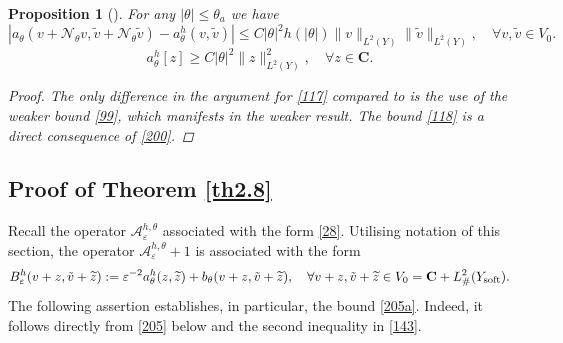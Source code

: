 \documentclass[11pt]{article}
\newcommand\e {\varepsilon}
\newcommand\soft{{\rm soft}}
\def\C{\mathbf {C}}
\def\AA{\mathcal{A}}
\newtheorem{proposition}[theorem]{Proposition}
\theoremstyle{remark}
\begin{document}
\begin{proposition}[{\cite[Proposition 5.5]{CKS2023}}]
	For any $|\theta|\leq \theta_a$ we have
	\begin{equation}\label{117}
		|a_\theta(v+\mathcal N_\theta v, \tilde v+\mathcal N_\theta \tilde v) - a_\theta^h(v,\tilde v)| \leq C |\theta|^2 h(|\theta|)\| v\|_{L^2(Y)} \|\tilde v\|_{L^2(Y)}, \quad \forall v,\tilde v\in V_0.
	\end{equation}
	\begin{equation}\label{118}
		a_\theta^h[z]\geq C|\theta|^2 \| z\|_{L^2(Y)}^2, \quad \forall z\in \C.
	\end{equation}
	\begin{proof}
		The only difference in the argument for \eqref{117} compared to \cite{CKS2023} is the use of the weaker bound \eqref{99},  which manifests in the weaker result. The bound \eqref{118} is   a direct consequence of \eqref{200}.
	\end{proof}
\end{proposition}




\subsection{Proof of Theorem \ref{th2.8}}

Recall the operator $\AA_\e^{h,\theta}$ associated with the form \eqref{28}. Utilising notation of this section, the operator $\AA_\e^{h,\theta}+1$ is associated with the form
\begin{equation*}%
	B^h_\e(v+z, \tilde v+ \widetilde z):=	\e^{-2} a_\theta^h(z, \widetilde z) + b_\theta(v + z, \tilde v+ \widetilde z), \quad \forall v+z, \tilde v+\widetilde z \in V_0 =\C+ L^2_\#(Y_\soft).
\end{equation*}
The following assertion establishes, in particular, the bound \eqref{205a}. Indeed, it follows directly from \eqref{205} below
and the second inequality in \eqref{143}.
\end{document}
